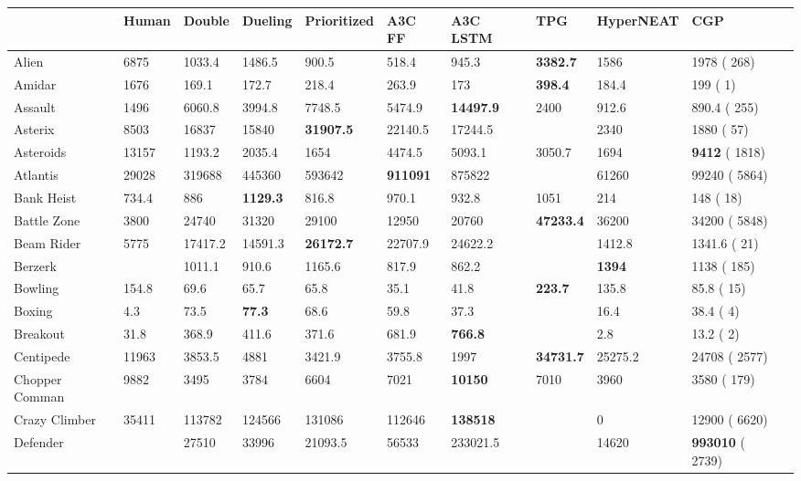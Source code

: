 \documentclass[sigconf,screen]{acmart}\settopmatter{printfolios=true,printacmref=false}
\begin{document}
 \begin{table*}[t]
  {\small
  \begin{tabular}{l l l l l l l l l l l}
 & Human & Double &  Dueling &  Prioritized &  A3C FF &  A3C LSTM & TPG & HyperNEAT & CGP\\\hline
Alien & 6875 & 1033.4 & 1486.5 & 900.5 & 518.4 & 945.3 & \textbf{3382.7} & 1586 & 1978 {\tiny( 268)}\\
Amidar & 1676 & 169.1 & 172.7 & 218.4 & 263.9 & 173 & \textbf{398.4} & 184.4 & 199 {\tiny( 1)}\\
Assault & 1496 & 6060.8 & 3994.8 & 7748.5 & 5474.9 & \textbf{14497.9} & 2400 & 912.6 & 890.4 {\tiny( 255)}\\
Asterix & 8503 & 16837 & 15840 & \textbf{31907.5} & 22140.5 & 17244.5 &  & 2340 & 1880 {\tiny( 57)}\\
Asteroids & 13157 & 1193.2 & 2035.4 & 1654 & 4474.5 & 5093.1 & 3050.7 & 1694 & \textbf{9412} {\tiny( 1818)}\\
Atlantis & 29028 & 319688 & 445360 & 593642 & \textbf{911091} & 875822 &  & 61260 & 99240 {\tiny( 5864)}\\
Bank Heist & 734.4 & 886 & \textbf{1129.3} & 816.8 & 970.1 & 932.8 & 1051 & 214 & 148 {\tiny( 18)}\\
Battle Zone & 3800 & 24740 & 31320 & 29100 & 12950 & 20760 & \textbf{47233.4} & 36200 & 34200 {\tiny( 5848)}\\
Beam Rider & 5775 & 17417.2 & 14591.3 & \textbf{26172.7} & 22707.9 & 24622.2 &  & 1412.8 & 1341.6 {\tiny( 21)}\\
Berzerk &  & 1011.1 & 910.6 & 1165.6 & 817.9 & 862.2 &  & \textbf{1394} & 1138 {\tiny( 185)}\\
Bowling & 154.8 & 69.6 & 65.7 & 65.8 & 35.1 & 41.8 & \textbf{223.7} & 135.8 & 85.8 {\tiny( 15)}\\
Boxing & 4.3 & 73.5 & \textbf{77.3} & 68.6 & 59.8 & 37.3 &  & 16.4 & 38.4 {\tiny( 4)}\\
Breakout & 31.8 & 368.9 & 411.6 & 371.6 & 681.9 & \textbf{766.8} &  & 2.8 & 13.2 {\tiny( 2)}\\
Centipede & 11963 & 3853.5 & 4881 & 3421.9 & 3755.8 & 1997 & \textbf{34731.7} & 25275.2 & 24708 {\tiny( 2577)}\\
Chopper Comman & 9882 & 3495 & 3784 & 6604 & 7021 & \textbf{10150} & 7010 & 3960 & 3580 {\tiny( 179)}\\
Crazy Climber & 35411 & 113782 & 124566 & 131086 & 112646 & \textbf{138518} &  & 0 & 12900 {\tiny( 6620)}\\
Defender &  & 27510 & 33996 & 21093.5 & 56533 & 233021.5 &  & 14620 & \textbf{993010} {\tiny( 2739)}\\

\end{tabular}}
\end{table*}
\end{document}
